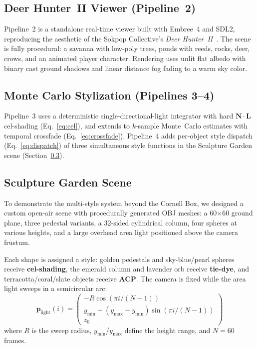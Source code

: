 \documentclass{article}
\begin{document}
\subsection{Deer Hunter~II Viewer (Pipeline~2)}

Pipeline~2 is a standalone real-time viewer built with Embree~4 and SDL2, reproducing the aesthetic of the Sokpop Collective's \emph{Deer Hunter~II}~\cite{sokpop2019deerhunter}. The scene is fully procedural: a savanna with low-poly trees, ponds with reeds, rocks, deer, crows, and an animated player character. Rendering uses unlit flat albedo with binary cast ground shadows and linear distance fog fading to a warm sky color.

\subsection{Monte Carlo Stylization (Pipelines 3--4)}

Pipeline~3 uses a deterministic single-directional-light integrator with hard $\mathbf{N} \cdot \mathbf{L}$ cel-shading (Eq.~\ref{eq:cel}), and extends to $k$-sample Monte~Carlo estimates with temporal crossfade (Eq.~\ref{eq:crossfade}). Pipeline~4 adds per-object style dispatch (Eq.~\ref{eq:dispatch}) of three simultaneous style functions in the Sculpture Garden scene (Section~\ref{sec:scene}).

\subsection{Sculpture Garden Scene}
\label{sec:scene}

To demonstrate the multi-style system beyond the Cornell Box, we designed a custom open-air scene with procedurally generated OBJ meshes: a 60$\times$60 ground plane, three pedestal variants, a 32-sided cylindrical column, four spheres at various heights, and a large overhead area light positioned above the camera frustum.

Each shape is assigned a style: golden pedestals and sky-blue/pearl spheres receive \textbf{cel-shading}, the emerald column and lavender orb receive \textbf{tie-dye}, and terracotta/coral/slate objects receive \textbf{ACP}. The camera is fixed while the area light sweeps in a semicircular arc:
\begin{equation}
    \mathbf{p}_{\text{light}}(i) = \begin{pmatrix} -R\cos(\pi i / (N-1)) \\ y_{\min} + (y_{\max} - y_{\min})\sin(\pi i / (N-1)) \\ z_0 \end{pmatrix}
    \label{eq:light_sweep}
\end{equation}
where $R$ is the sweep radius, $y_{\min}$/$y_{\max}$ define the height range, and $N = 60$ frames.
\end{document}
